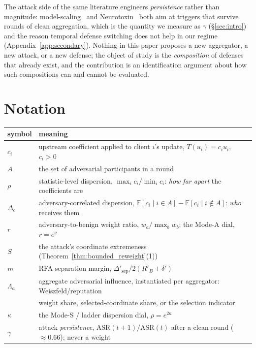 \documentclass{article}
\begin{document}
\noindent The attack side of the same literature engineers \emph{persistence} rather than magnitude: model-scaling~\citep{bagdasaryan2020backdoor} and Neurotoxin~\citep{zhang2022neurotoxin} both aim at triggers that survive rounds of clean aggregation, which is the quantity we measure as $\gamma$ (\S\ref{sec:intro}) and the reason temporal defense switching does not help in our regime (Appendix~\ref{app:secondary}). Nothing in this paper proposes a new aggregator, a new attack, or a new defense; the object of study is the \emph{composition} of defenses that already exist, and the contribution is an identification argument about how such compositions can and cannot be evaluated.

\section{Notation}
\label{app:notation}

\begin{center}\small
\begin{tabular}{@{}ll@{}}
\toprule
symbol & meaning \\
\midrule
$c_i$ & upstream coefficient applied to client $i$'s update, $T(u_i) = c_iu_i$, $c_i>0$ \\
$A$ & the set of adversarial participants in a round \\
$\rho$ & statistic-level dispersion, $\max_i c_i/\min_i c_i$: \emph{how far apart} the coefficients are \\
$\Delta_c$ & adversary-correlated dispersion, $\mathbb{E}[c_i \mid i \in A]-\mathbb{E}[c_i \mid i \notin A]$: \emph{who} receives them \\
$r$ & adversary-to-benign weight ratio, $w_a/\max_b w_b$; the Mode-A dial, $r = e^{\nu}$ \\
$S$ & the attack's coordinate extremeness (Theorem~\ref{thm:bounded_reweight}(1)) \\
$m$ & RFA separation margin, $\Delta'_{\mathrm{sep}}/2(R'_B{+}\delta')$ \\
$\Lambda_a$ & aggregate adversarial influence, instantiated per aggregator: Weiszfeld/reputation \\
 & weight share, selected-coordinate share, or the selection indicator \\
$\kappa$ & the Mode-S / ladder dispersion dial, $\rho = e^{2\kappa}$ \\
$\gamma$ & attack \emph{persistence}, $\mathrm{ASR}(t{+}1)/\mathrm{ASR}(t)$ after a clean round ($\approx 0.66$); never a weight \\
\bottomrule
\end{tabular}
\end{center}
\end{document}
